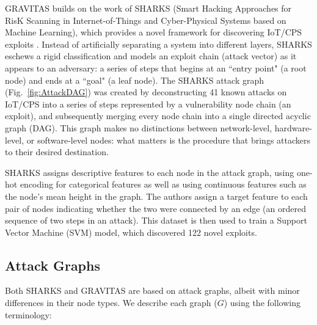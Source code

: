 \documentclass[10pt,journal,compsoc]{IEEEtran}
\begin{document}
GRAVITAS builds on the work of SHARKS (Smart Hacking Approaches for RisK Scanning in
Internet-of-Things and Cyber-Physical Systems based on Machine Learning), which provides a novel framework for discovering IoT/CPS exploits \cite{saha2020}. Instead of artificially separating a system into different layers, SHARKS eschews a rigid classification and models an exploit chain (attack vector) as it appears to an adversary: a series of steps that begins at an ``entry point"  (a root node) and ends at a ``goal"  (a leaf node). The SHARKS attack graph (Fig.~\ref{fig:AttackDAG}) was created by deconstructing 41 known attacks on IoT/CPS into a series of steps represented by a vulnerability node chain (an exploit), and subsequently merging every node chain into a single directed acyclic graph (DAG). This graph makes no distinctions between network-level, hardware-level, or software-level nodes: what matters is the procedure that brings attackers to their desired destination.
 
\par SHARKS assigns descriptive features to each node in the attack graph, using one-hot encoding 
for categorical features as well as using continuous features such as the 
node's mean height in the graph. The authors assign a target feature to each pair of nodes 
indicating whether the two were connected by an edge (an ordered sequence of two steps in an attack). 
This dataset is then used to train a Support Vector Machine (SVM) model, which discovered 122 novel 
exploits. 

\subsection{Attack Graphs}

Both SHARKS and GRAVITAS are based on attack graphs, albeit with minor differences in their node types. We describe each graph ($G$) using the following terminology:
\end{document}
